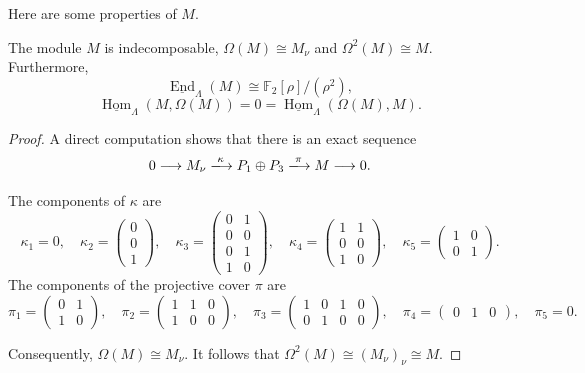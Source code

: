 \documentclass[a4paper,reqno,10pt]{amsart}
\numberwithin{equation}{section}
\DeclareMathOperator{\End}{End}
\DeclareMathOperator{\Hom}{Hom}
\newcommand{\kk}{\mathbb F_2}
\newcommand{\Lam}{\Lambda}
\newcommand{\ol}[1]{\underline{#1}}
\begin{document}
Here are some properties of $M$. 

\begin{proposition}\label{prop:M}
The module $M$ is indecomposable, $\Omega(M)\cong M_\nu$ and $\Omega^2(M)\cong M$. Furthermore, 
\[
 \ol{\End}_\Lam(M) \cong\kk[\rho]/(\rho^2),
\]
\[
 \ol{\Hom}_\Lam(M,\Omega(M))=0
 =\ol{\Hom}_\Lam(\Omega(M),M).
\]
\end{proposition}

\begin{proof}
A direct computation shows that there is an exact sequence
\begin{equation}\label{PM}
     0\longrightarrow M_\nu
 \xlongrightarrow{\kappa}P_1\oplus P_3
 \xlongrightarrow{\pi}M
 \longrightarrow0.
\end{equation}

The components of $\kappa$ are
\[
 \kappa_1=0,\quad
 \kappa_2=
 \begin{pmatrix}
 0\\0\\1
 \end{pmatrix},\quad
 \kappa_3=
 \begin{pmatrix}
 0&1\\
 0&0\\
 0&1\\
 1&0
 \end{pmatrix},\quad
 \kappa_4=
 \begin{pmatrix}
 1&1\\
 0&0\\
 1&0
 \end{pmatrix},\quad
 \kappa_5=
 \begin{pmatrix}
 1&0\\
 0&1
 \end{pmatrix}.
\]
The components of the projective cover $\pi$ are
\[
 \pi_1=
 \begin{pmatrix}
 0&1\\
 1&0
 \end{pmatrix},\quad
 \pi_2=
 \begin{pmatrix}
 1&1&0\\
 1&0&0
 \end{pmatrix},\quad
 \pi_3=
 \begin{pmatrix}
 1&0&1&0\\
 0&1&0&0
 \end{pmatrix},\quad
 \pi_4=
 \begin{pmatrix}
 0&1&0
 \end{pmatrix},\quad
 \pi_5=0.
\]

Consequently, $\Omega(M)\cong M_\nu$. It follows that $\Omega^2(M)\cong(M_\nu)_\nu\cong M$. 


\end{proof}
\end{document}
